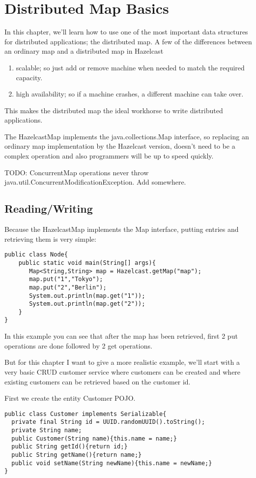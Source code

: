 \chapter{Distributed Map Basics}

In this chapter, we'll learn how to use one of the most important data structures for distributed applications; the distributed map. A few of the differences between an ordinary map and a distributed map in Hazelcast
\begin{enumerate}
\item scalable; so just add or remove machine when needed to match the required capacity.
\item high availability; so if a machine crashes, a different machine can take over. 
\end{enumerate}
This makes the distributed map the ideal workhorse to write distributed applications.

The HazelcastMap implements the java.collections.Map interface, so replacing an ordinary map implementation by the Hazelcast version, doesn't need to be a complex operation and also programmers will be up to speed quickly.

TODO: ConcurrentMap operations never throw java.util.ConcurrentModificationException. Add somewhere.

\section{Reading/Writing}
Because the HazelcastMap implements the Map interface, putting entries and retrieving them is very simple:

\begin{verbatim}
public class Node{
    public static void main(String[] args){
       Map<String,String> map = Hazelcast.getMap("map");
       map.put("1","Tokyo");
       map.put("2","Berlin");
       System.out.println(map.get("1"));
       System.out.println(map.get("2"));
    }
}
\end{verbatim}
In this example you can see that after the map has been retrieved, first 2 put operations are done followed by 2 get operations. 

But for this chapter I want to give a more realistic example, we'll start with a  very basic CRUD customer service where customers can be created and where existing customers can be retrieved based on the customer id.

First we create the entity Customer POJO. 
\begin{verbatim}
public class Customer implements Serializable{
  private final String id = UUID.randomUUID().toString();
  private String name;
  public Customer(String name){this.name = name;}
  public String getId(){return id;}
  public String getName(){return name;}
  public void setName(String newName){this.name = newName;}
}
\end{verbatim}

